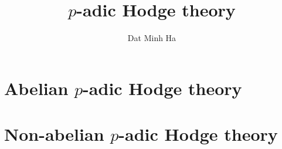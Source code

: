 

\setcounter{section}{-1}





	\title{\texorpdfstring{$p$}{}-adic Hodge theory}
	
	\author{Dat Minh Ha}
	\maketitle
	
	{
      \hypersetup{} 
      \tableofcontents %
    }
    
    
	
	\chapter{Abelian \texorpdfstring{$p$}{}-adic Hodge theory}
	    
	    
	    
	
	\chapter{Non-abelian \texorpdfstring{$p$}{}-adic Hodge theory}
	    
	    
	    
	    
	    
	    
    \begin{appendices}
        
    \end{appendices}
	
	\printbibliography

